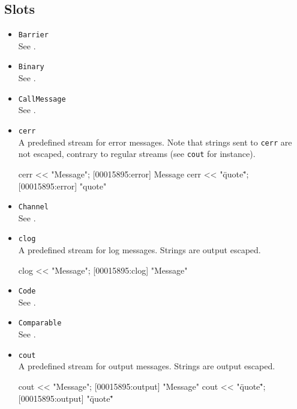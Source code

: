 \subsection{Slots}
\begin{itemize}
\item \lstinline|Barrier|\\
  See .
\item \lstinline|Binary|\\
  See .
\item \lstinline|CallMessage|\\
  See .

\item \lstinline|cerr|\\
  A predefined stream for error messages.  Note that strings sent to
  \lstinline|cerr| are not escaped, contrary to regular streams (see
  \lstinline|cout| for instance).
\begin{urbiscript}[firstnumber=last]
cerr << "Message";
[00015895:error] Message
cerr << "\"quote\"";
[00015895:error] "quote"
\end{urbiscript}

\item \lstinline|Channel|\\
  See .

\item \lstinline|clog|\\
  A predefined stream for log messages.  Strings are output escaped.
\begin{urbiscript}[firstnumber=last]
clog << "Message";
[00015895:clog] "Message"
\end{urbiscript}

\item \lstinline|Code|\\
  See .

\item \lstinline|Comparable|\\
  See .

\item \lstinline|cout|\\
  A predefined stream for output messages.  Strings are output
  escaped.
\begin{urbiscript}[firstnumber=last]
cout << "Message";
[00015895:output] "Message"
cout << "\"quote\"";
[00015895:output] "\"quote\""
\end{urbiscript}


\end{itemize}

